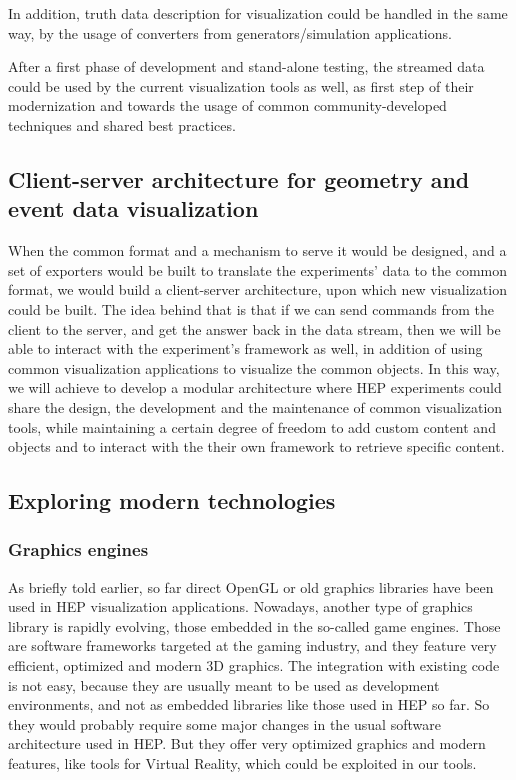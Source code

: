 \documentclass[12pt,a4paper]{article}
\begin{document}
In addition, truth data description for visualization could be handled in the same way, by the usage of converters from
generators/simulation applications.

After a first phase of development and stand-alone testing, the streamed data could be used by the current visualization tools
as well, as first step of their modernization and towards the usage of common community-developed techniques and shared best practices.

\hypertarget{client-server}{%
\subsection{Client-server architecture for geometry and event data visualization}\label{client-server}}

When the common format and a mechanism to serve it would be designed, and a set of exporters would be built to translate the
experiments’ data to the common format, we would build a client-server architecture, upon which new visualization could be built.
The idea behind that is that if we can send commands from the client to the server, and get the answer back in the data stream,
then we will be able to interact with the experiment’s framework as well, in addition of using common visualization applications
to visualize the common objects. In this way, we will achieve to develop a modular architecture where HEP experiments could share
the design, the development and the maintenance of common visualization tools, while maintaining a certain degree of freedom to
add custom content and objects and to interact with the their own framework to retrieve specific content.

\hypertarget{modern-tech}{%
\subsection{Exploring modern technologies}\label{modern-tech}}

\hypertarget{graphic-engines}{%
\subsubsection{Graphics engines}\label{graphic-engines}}

As briefly told earlier, so far direct OpenGL or old graphics libraries have been used in HEP visualization applications. Nowadays,
another type of graphics library is rapidly evolving, those embedded in the so-called game engines. Those are software frameworks
targeted at the gaming industry, and they feature very efficient, optimized and modern 3D graphics.
The integration with existing code is not easy, because they are usually meant to be used as development environments, and not as
embedded libraries like those used in HEP so far. So they would probably require some major changes in the usual software architecture
used in HEP. But they offer very optimized graphics and modern features, like tools for Virtual Reality, which could be exploited in our tools.
\end{document}
